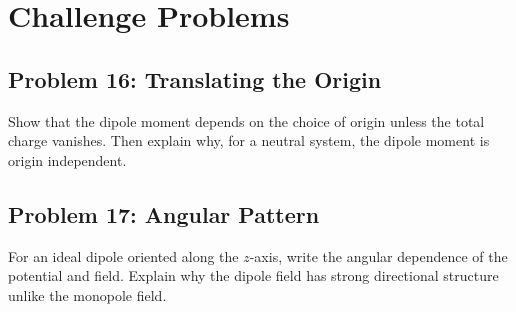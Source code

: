 \documentclass[hidelinks]{article}
\begin{document}
\section{Challenge Problems}
\subsection{Problem 16: Translating the Origin}
Show that the dipole moment depends on the choice of origin unless the total charge vanishes. Then explain why, for a neutral system, the dipole moment is origin independent.

\subsection{Problem 17: Angular Pattern}
For an ideal dipole oriented along the $z$-axis, write the angular dependence of the potential and field. Explain why the dipole field has strong directional structure unlike the monopole field.
\end{document}
